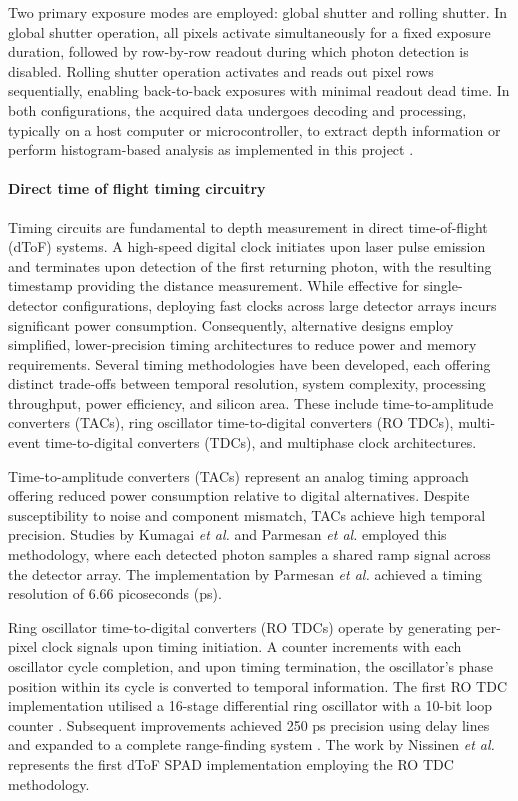 \documentclass[12pt,a4paper,oneside]{report}
\begin{document}
Two primary exposure modes are employed: global shutter and rolling shutter. In global shutter operation, all pixels activate simultaneously for a fixed exposure duration, followed by row-by-row readout during which photon detection is disabled. Rolling shutter operation activates and reads out pixel rows sequentially, enabling back-to-back exposures with minimal readout dead time. In both configurations, the acquired data undergoes decoding and processing, typically on a host computer or microcontroller, to extract depth information or perform histogram-based analysis as implemented in this project \cite{piron2020}.

\paragraph{Direct time of flight timing circuitry}
\label{par:direct_tof_timing_circuitry}

Timing circuits are fundamental to depth measurement in direct time-of-flight (dToF) systems. A high-speed digital clock initiates upon laser pulse emission and terminates upon detection of the first returning photon, with the resulting timestamp providing the distance measurement. While effective for single-detector configurations, deploying fast clocks across large detector arrays incurs significant power consumption. Consequently, alternative designs employ simplified, lower-precision timing architectures to reduce power and memory requirements. Several timing methodologies have been developed, each offering distinct trade-offs between temporal resolution, system complexity, processing throughput, power efficiency, and silicon area. These include time-to-amplitude converters (TACs), ring oscillator time-to-digital converters (RO TDCs), multi-event time-to-digital converters (TDCs), and multiphase clock architectures.

Time-to-amplitude converters (TACs) represent an analog timing approach offering reduced power consumption relative to digital alternatives. Despite susceptibility to noise and component mismatch, TACs achieve high temporal precision. Studies by Kumagai \textit{et al.} \cite{kumagai2021} and Parmesan \textit{et al.} \cite{parmesan2014} employed this methodology, where each detected photon samples a shared ramp signal across the detector array. The implementation by Parmesan \textit{et al.} \cite{parmesan2014} achieved a timing resolution of 6.66 picoseconds (ps).

Ring oscillator time-to-digital converters (RO TDCs) operate by generating per-pixel clock signals upon timing initiation. A counter increments with each oscillator cycle completion, and upon timing termination, the oscillator's phase position within its cycle is converted to temporal information. The first RO TDC implementation utilised a 16-stage differential ring oscillator with a 10-bit loop counter \cite{nissinen2003}. Subsequent improvements achieved 250 ps precision using delay lines and expanded to a complete range-finding system \cite{nissinen2009}. The work by Nissinen \textit{et al.} \cite{nissinen2009} represents the first dToF SPAD implementation employing the RO TDC methodology.
\end{document}
